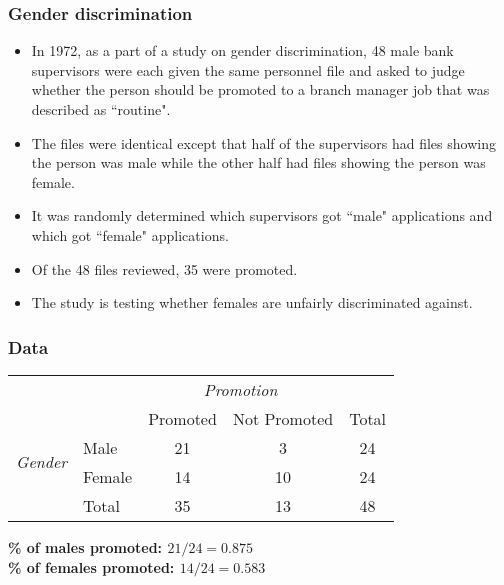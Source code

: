 \documentclass[slidestop,compress,mathserif]{beamer}
\newcommand{\soln}[1]{\textit{#1}}
\begin{document}
\begin{frame}
\frametitle{Gender discrimination}

\begin{itemize}

\item In 1972, as a part of a study on gender discrimination, 48 male bank supervisors were each given the same personnel file and asked to judge whether the person should be promoted to a branch manager job that was described as ``routine". 

\item The files were identical except that half of the supervisors had files showing the person was male while the other half had files showing the person was female.

\item It was randomly determined which supervisors got ``male" applications and which got ``female" applications.  

\item Of the 48 files reviewed, 35 were promoted. 

\item The study is testing whether females are unfairly discriminated against.  
\end{itemize}

 \soln{}


\end{frame}



\begin{frame}
\frametitle{Data}


\begin{center}
\begin{tabular}{ll  cc c} 
  		&				& \multicolumn{2}{c}{\textit{Promotion}} \\
\cline{3-4}
							&			& Promoted	& Not Promoted 	& Total	\\
\cline{2-5}
\multirow{2}{*}{\textit{Gender	}}	&Male 		& 21	 	& 3		& 24 	\\
							&Female		& 14	 	& 10 	 	& 24 \\
\cline{2-5}
							&Total		& 35		& 13		& 48 \\
\end{tabular}
\end{center}

\pause

\textbf{\% of males promoted: $21 / 24 = 0.875$} \\
\textbf{\% of females promoted: $14 / 24 = 0.583$}

\end{frame}
\end{document}
